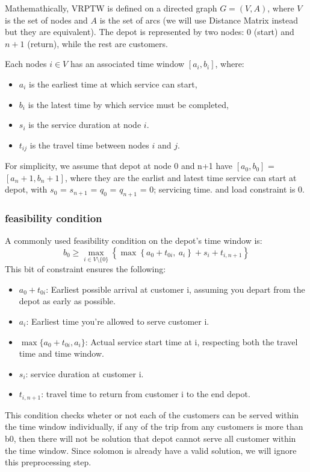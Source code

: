 \documentclass[twocolumn, 10pt]{article}
\begin{document}
Mathemathically, VRPTW is defined on a directed graph \(G = (V, A)\), where \(V\) is the set of nodes and \(A\) is the set of arcs (we will use Distance Matrix instead but they are equivalent). The depot is represented by two nodes: \(0\) (start) and \(n+1\) (return), while the rest are customers.

Each nodes \(i \in V\) has an associated time window \([a_i, b_i]\), where:
\begin{itemize}
    \item \(a_i\) is the earliest time at which service can start,
    \item \(b_i\) is the latest time by which service must be completed,
    \item \(s_i\) is the service duration at node \(i\).
    \item \(t_{ij}\) is the travel time between nodes \(i\) and \(j\).
\end{itemize}

For simplicity, we assume that depot at node 0 and n+1 have \([a_0, b_0]\) = \([a_n+1, b_n+1]\), where they are the earlist and latest time service can start at depot,
with \(s_0\) = \(s_{n+1}\) =  \(q_{0}\) =  \(q_{n+1}\) = 0; servicing time. and load constraint is 0.

\subsubsection*{feasibility condition}
A commonly used feasibility condition on the depot's time window is:
\[
b_0 \geq \max_{i \in V \setminus \{0\}} \left\{ \max\left\{ a_0 + t_{0i},\ a_i \right\} + s_i + t_{i, n+1} \right\}
\]
This bit of constraint ensures the following:
\begin{itemize}
    \item $a_0 + t_{0i}$: Earliest possible arrival at customer i, assuming you depart from the depot as early as possible.
    \item $a_i$: Earliest time you’re allowed to serve customer i.
    \item $\max\{a_0 + t_{0i}, a_i\}$: Actual service start time at i, respecting both the travel time and time window.
    \item $s_i$: service duration at customer i.
    \item $t_{i,n+1}$: travel time to return from customer i to the end depot.
\end{itemize}

This condition checks wheter or not each of the customers can be served within the time window individually, if any of the trip from any
customers is more than b0, then there will not be solution that 
depot cannot serve all customer within the time window.
Since solomon is already have a valid solution, we will ignore this preprocessing step.
\end{document}
